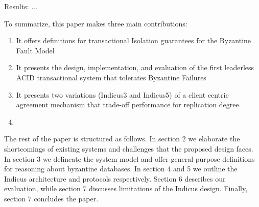 Results:  ...

To summarize, this paper makes three main contributions:
\begin{enumerate}
\item It offers definitions for transactional Isolation guarantees for the Byzantine Fault Model
\item It presents the design, implementation, and evaluation of the first leaderless ACID transactional system that tolerates Byzantine Failures
\item It presents two variations (Indicus3 and Indicus5) of a client centric agreement mechanism that trade-off performance for replication degree.  
\item {}
\end{enumerate}

The rest of the paper is structured as follows. In section 2 we elaborate the shortcomings of existing systems and challenges that the proposed design faces. In section 3 we delineate the system model and offer general purpose definitions for reasoning about byzantine databases. In section 4 and 5 we outline the Indicus architecture and protocols respectively. Section 6 describes our evaluation, while section 7 discusses limitations of the Indicus design. Finally, section 7 concludes the paper. 
